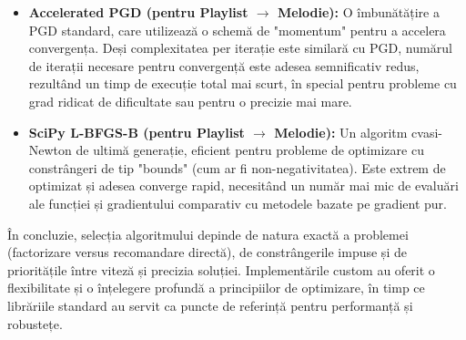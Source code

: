 \documentclass[12pt,a4paper]{article}
\begin{document}
\begin{itemize}
		\item \textbf{Accelerated PGD (pentru Playlist $\rightarrow$ Melodie):}
		    O îmbunătățire a PGD standard, care utilizează o schemă de "momentum" pentru a accelera convergența. Deși complexitatea per iterație este similară cu PGD, numărul de iterații necesare pentru convergență este adesea semnificativ redus, rezultând un timp de execuție total mai scurt, în special pentru probleme cu grad ridicat de dificultate sau pentru o precizie mai mare.

		\item \textbf{SciPy L-BFGS-B (pentru Playlist $\rightarrow$ Melodie):}
		    Un algoritm cvasi-Newton de ultimă generație, eficient pentru probleme de optimizare cu constrângeri de tip "bounds" (cum ar fi non-negativitatea). Este extrem de optimizat și adesea converge rapid, necesitând un număr mai mic de evaluări ale funcției și gradientului comparativ cu metodele bazate pe gradient pur. 
	\end{itemize}
	În concluzie, selecția algoritmului depinde de natura exactă a problemei (factorizare versus recomandare directă), de constrângerile impuse și de prioritățile între viteză și precizia soluției. Implementările custom au oferit o flexibilitate și o înțelegere profundă a principiilor de optimizare, în timp ce librăriile standard au servit ca puncte de referință pentru performanță și robustețe.
\end{document}
